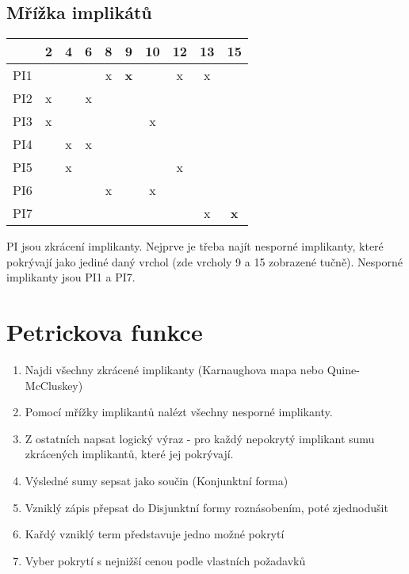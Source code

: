 \documentclass[a4wide]{report}
\begin{document}
\subsection{Mřížka implikátů}

\begin{tabular}{| c || c | c | c | c | c | c | c | c | c |}
	\hline
		& 2 & 4 & 6 & 8 & 9 & 10 & 12 & 13 & 15 \\ \hline \hline
	PI1	&   &   &   & x & \textbf{x} &    & x  & x  &    \\ \hline
	PI2	& x &   & x &   &   &    &    &    &    \\ \hline
	PI3	& x &   &   &   &   & x  &    &    &    \\ \hline
	PI4	&   & x & x &   &   &    &    &    &    \\ \hline
	PI5	&   & x &   &   &   &    & x  &    &    \\ \hline
	PI6	&   &   &   & x &   & x  &    &    &    \\ \hline
	PI7	&   &   &   &   &   &    &    & x  & \textbf{x}  \\ \hline
\end{tabular}

PI jsou zkrácení implikanty. Nejprve je třeba najít nesporné implikanty, které pokrývají jako jediné daný vrchol (zde vrcholy 9 a 15 zobrazené tučně). Nesporné implikanty jsou PI1 a PI7.

\section{Petrickova funkce}

\begin{enumerate}
	\item Najdi všechny zkrácené implikanty (Karnaughova mapa nebo Quine-McCluskey)
	\item Pomocí mřížky implikantů nalézt všechny nesporné implikanty.
	\item Z ostatních napsat logický výraz - pro každý nepokrytý implikant sumu zkrácených implikantů, které jej pokrývají.
	\item Výsledné sumy sepsat jako součin (Konjunktní forma)
	\item Vzniklý zápis přepsat do Disjunktní formy roznásobením, poté zjednodušit
	\item Kařdý vzniklý term představuje jedno možné pokrytí
	\item Vyber pokrytí s nejnižší cenou podle vlastních požadavků
\end{enumerate}
\end{document}
